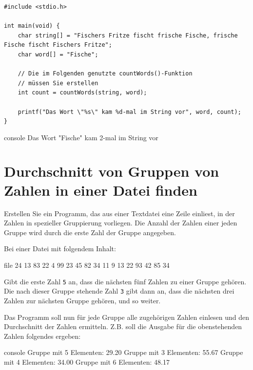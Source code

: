 \Vorlage
\begin{verbatim}
#include <stdio.h>

int main(void) {
    char string[] = "Fischers Fritze fischt frische Fische, frische Fische fischt Fischers Fritze";
    char word[] = "Fische";

    // Die im Folgenden genutzte countWords()-Funktion
    // müssen Sie erstellen
    int count = countWords(string, word);

    printf("Das Wort \"%s\" kam %d-mal im String vor", word, count);
}
\end{verbatim}

\begin{mybox}[Bildschirmausgabe]{console}
Das Wort "Fische" kam 2-mal im String vor
\end{mybox}



\chapter{Durchschnitt von Gruppen von Zahlen in einer Datei finden}

\vspace{10pt}

Erstellen Sie ein Programm, das aus einer Textdatei eine Zeile einliest, in der
Zahlen in spezieller Gruppierung vorliegen. Die Anzahl der Zahlen einer jeden
Gruppe wird durch die erste Zahl der Gruppe angegeben.

Bei einer Datei mit folgendem Inhalt:

\begin{mybox}{file}
 24 13 83 22 4  99 23 45  82 34 11 9  13 22 93 42 85 34
\end{mybox}

Gibt die erste Zahl \texttt{5} an, dass die nächsten fünf Zahlen zu
einer Gruppe gehören. Die nach dieser Gruppe stehende Zahl \texttt{3}
gibt dann an, dass die nächsten drei Zahlen zur nächsten Gruppe gehören, und so
weiter.

Das Programm soll nun für jede Gruppe alle zugehörigen Zahlen einlesen und den
Durchschnitt der Zahlen ermitteln. Z.B. soll die Ausgabe für die obenstehenden
Zahlen folgendes ergeben:

\begin{mybox}[Bildschirmausgabe]{console}
Gruppe mit 5 Elementen: 29.20
Gruppe mit 3 Elementen: 55.67
Gruppe mit 4 Elementen: 34.00
Gruppe mit 6 Elementen: 48.17
\end{mybox}





